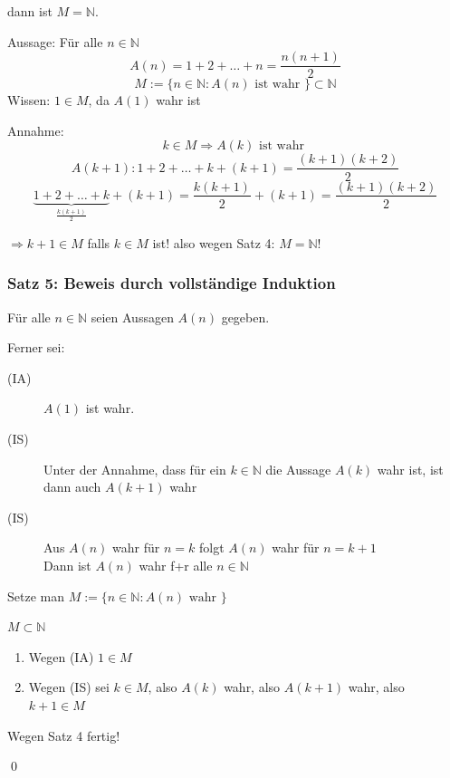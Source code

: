 \documentclass[fleqn]{scrartcl}
\renewenvironment{proof}{{\bfseries Beweis }}{\qed}
\newenvironment{example}{{\bfseries Beispiel }}{}
\begin{document}
dann ist $M = \mathbb{N}$.

\begin{example}
Aussage: Für alle $n \in \mathbb{N}$
\[A(n) = 1+2+\ldots+n = \frac{n(n+1)}{2}\]
\[M:=\{n \in \mathbb{N} : A(n) \text{ ist wahr }\} \subset \mathbb{N}\]
Wissen: $1 \in M$, da $A(1)$ wahr ist

Annahme: 
\[k \in M \Longrightarrow A(k) \text{ ist wahr }\]
\[A(k+1):1+2+\ldots+k+(k+1)= \frac{(k+1)(k+2)}{2}\]
\[\underbrace{1+2+\ldots+k}_{\frac{k(k+1)}{2}}+(k+1)= \frac{k(k+1)}{2}+(k+1)=\frac{(k+1)(k+2)}{2}\]

$\Longrightarrow k+1 \in M$ falls $k \in M$ ist! also wegen Satz 4: $M=\mathbb{N}$!
\end{example}

\subsubsection{Satz 5: Beweis durch vollständige Induktion}

Für alle $n \in \mathbb{N}$ seien Aussagen $A(n)$ gegeben.

Ferner sei:

\begin{description}
 \item[(IA)] $A(1)$ ist wahr.
 \item[(IS)] Unter der Annahme, dass für ein $k \in \mathbb{N}$ die Aussage $A(k)$ wahr ist, ist dann auch $A(k+1)$ wahr
 \item[(IS)] Aus $A(n)$ wahr für $n=k$ folgt $A(n)$ wahr für $n=k+1$ \\
   Dann ist $A(n)$ wahr f+r alle $n \in \mathbb{N}$
\end{description}

\begin{proof}

Setze man $M:=\{n \in \mathbb{N}:A(n) \text{ wahr }\}$

$M \subset \mathbb{N}$

\begin{enumerate}
  \item Wegen (IA) $1 \in M$
  \item Wegen (IS) sei $k \in M$, also $A(k)$ wahr, also $A(k+1)$ wahr, also $k+1 \in M$ 
\end{enumerate}

Wegen Satz 4 fertig!

\end{proof}
\end{document}
